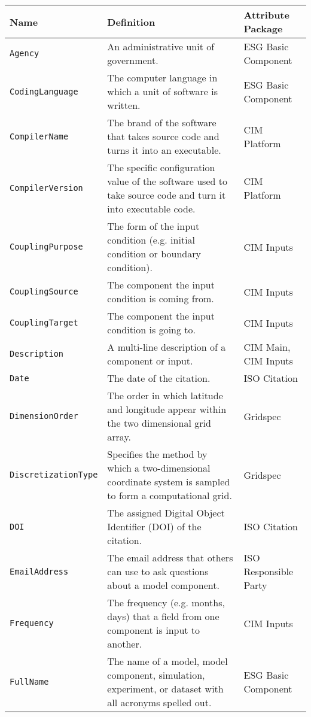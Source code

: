 \noindent

\begin{longtable}{|p{7cm}|p{5cm}|p{2cm}}
     \hline\hline
     {\bf Name} & {\bf Definition} & {\bf Attribute Package}\\
     \hline\hline
     {\tt Agency} & An administrative unit of government.& ESG Basic Component\\
     {\tt CodingLanguage} & The computer language in which a unit of software is written. & ESG Basic Component\\
     {\tt CompilerName} & The brand of the software that takes source code and turns it into an executable.& CIM Platform\\
     {\tt CompilerVersion} & The specific configuration value of the software used to take source code and turn it into executable code. & CIM Platform\\
     {\tt CouplingPurpose} & The form of the input condition (e.g. initial condition or boundary condition). &  CIM Inputs \\
     {\tt CouplingSource} & The component the input condition is coming from. & CIM Inputs\\ 
     {\tt CouplingTarget} & The component the input condition is going to. & CIM Inputs\\ 
     {\tt Description} & A multi-line description of a component or input. & CIM Main, CIM Inputs \\
     {\tt Date} & The date of the citation. & ISO Citation\\
     {\tt DimensionOrder} & The order in which latitude and longitude appear within the two dimensional grid array. & Gridspec\\ 
     {\tt DiscretizationType} & Specifies the method by which a two-dimensional coordinate system is sampled to form a computational grid.& Gridspec \\
     {\tt DOI} & The assigned Digital Object Identifier (DOI) of the citation. & ISO Citation\\
     {\tt EmailAddress} & The email address that others can use to ask questions about a model component. & ISO Responsible Party\\
     {\tt Frequency} & The frequency (e.g. months, days) that a field from one component is input to another. & CIM Inputs\\ 
     {\tt FullName} & The name of a model, model component, simulation, experiment, or dataset with all acronyms spelled out.& ESG Basic Component\\

\end{longtable}

